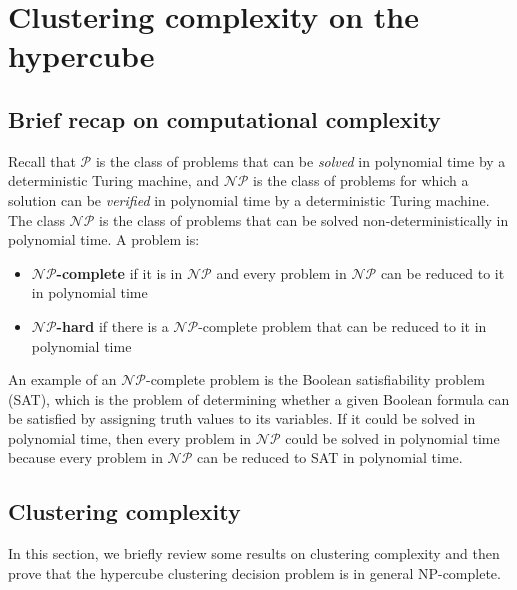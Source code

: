 \section{Clustering complexity on the hypercube}
\subsection{Brief recap on computational complexity}
Recall that $\mathcal{P}$ is the class of problems that can be \textit{solved} in polynomial time by a deterministic Turing machine, and $\mathcal{NP}$ is the class of problems for which a solution can be \textit{verified} in polynomial time by a deterministic Turing machine. The class $\mathcal{NP}$ is the class of problems that can be solved non-deterministically in polynomial time. A problem is:
\begin{itemize}
    \item \textbf{$\mathcal{NP}$-complete} if it is in $\mathcal{NP}$ and every problem in $\mathcal{NP}$ can be reduced to it in polynomial time
    \item \textbf{$\mathcal{NP}$-hard} if there is a $\mathcal{NP}$-complete problem that can be reduced to it in polynomial time
\end{itemize}
An example of an $\mathcal{NP}$-complete problem is the Boolean satisfiability problem (SAT), which is the problem of determining whether a given Boolean formula can be satisfied by assigning truth values to its variables. If it could be solved in polynomial time, then every problem in $\mathcal{NP}$ could be solved in polynomial time because every problem in $\mathcal{NP}$ can be reduced to SAT in polynomial time.

\subsection{Clustering complexity}
In this section, we briefly review some results on clustering complexity and then prove that the hypercube clustering decision problem is in general NP-complete. 


